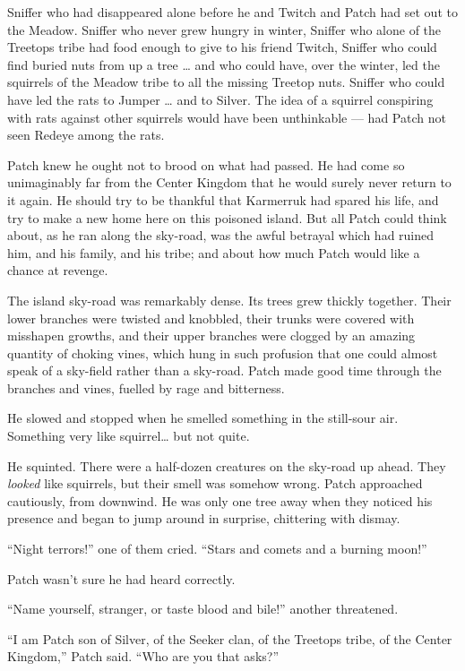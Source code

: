 \documentclass[12pt]{memoir}
\begin{document}
Sniffer who had disappeared alone before he and Twitch and Patch had
set out to the Meadow. Sniffer who never grew hungry in winter,
Sniffer who alone of the Treetops tribe had food enough to give to his
friend Twitch, Sniffer who could find buried nuts from up a tree … and
who could have, over the winter, led the squirrels of the Meadow tribe
to all the missing Treetop nuts. Sniffer who could have led the rats
to Jumper … and to Silver. The idea of a squirrel conspiring with rats
against other squirrels would have been unthinkable — had Patch not
seen Redeye among the rats.

Patch knew he ought not to brood on what had passed. He had come so
unimaginably far from the Center Kingdom that he would surely never
return to it again. He should try to be thankful that Karmerruk had
spared his life, and try to make a new home here on this poisoned
island. But all Patch could think about, as he ran along the sky-road,
was the awful betrayal which had ruined him, and his family, and his
tribe; and about how much Patch would like a chance at revenge.

The island sky-road was remarkably dense. Its trees grew thickly
together. Their lower branches were twisted and knobbled, their trunks
were covered with misshapen growths, and their upper branches were
clogged by an amazing quantity of choking vines, which hung in such
profusion that one could almost speak of a sky-field rather than a
sky-road. Patch made good time through the branches and vines, fuelled
by rage and bitterness.

He slowed and stopped when he smelled something in the still-sour
air. Something very like squirrel… but not quite.

He squinted. There were a half-dozen creatures on the sky-road up
ahead. They \textit{looked} like squirrels, but their smell was
somehow wrong. Patch approached cautiously, from downwind. He was only
one tree away when they noticed his presence and began to jump around
in surprise, chittering with dismay.

“Night terrors!” one of them cried. “Stars and comets and a burning
moon!”

Patch wasn’t sure he had heard correctly.

“Name yourself, stranger, or taste blood and bile!” another
threatened.

“I am Patch son of Silver, of the Seeker clan, of the Treetops tribe,
of the Center Kingdom,” Patch said. “Who are you that asks?”
\end{document}
